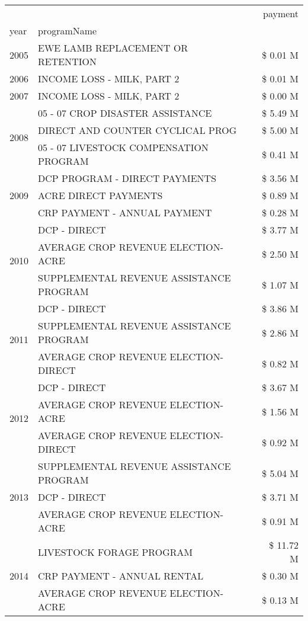 \begin{tabular}{llr}
\toprule
 &  & payment \\
year & programName &  \\
\midrule
2005 & EWE LAMB REPLACEMENT OR RETENTION & \$ 0.01 M \\
\cline{1-3}
2006 & INCOME LOSS - MILK, PART 2 & \$ 0.01 M \\
\cline{1-3}
2007 & INCOME LOSS - MILK, PART 2 & \$ 0.00 M \\
\cline{1-3}
\multirow[t]{3}{*}{2008} & 05 - 07 CROP DISASTER ASSISTANCE & \$ 5.49 M \\
 & DIRECT AND COUNTER CYCLICAL PROG & \$ 5.00 M \\
 & 05 - 07 LIVESTOCK COMPENSATION PROGRAM & \$ 0.41 M \\
\cline{1-3}
\multirow[t]{3}{*}{2009} & DCP PROGRAM - DIRECT PAYMENTS & \$ 3.56 M \\
 & ACRE DIRECT PAYMENTS & \$ 0.89 M \\
 & CRP PAYMENT - ANNUAL PAYMENT & \$ 0.28 M \\
\cline{1-3}
\multirow[t]{3}{*}{2010} & DCP - DIRECT & \$ 3.77 M \\
 & AVERAGE CROP REVENUE ELECTION-ACRE & \$ 2.50 M \\
 & SUPPLEMENTAL REVENUE ASSISTANCE PROGRAM & \$ 1.07 M \\
\cline{1-3}
\multirow[t]{3}{*}{2011} & DCP - DIRECT & \$ 3.86 M \\
 & SUPPLEMENTAL REVENUE ASSISTANCE PROGRAM & \$ 2.86 M \\
 & AVERAGE CROP REVENUE ELECTION-DIRECT & \$ 0.82 M \\
\cline{1-3}
\multirow[t]{3}{*}{2012} & DCP - DIRECT & \$ 3.67 M \\
 & AVERAGE CROP REVENUE ELECTION-ACRE & \$ 1.56 M \\
 & AVERAGE CROP REVENUE ELECTION-DIRECT & \$ 0.92 M \\
\cline{1-3}
\multirow[t]{3}{*}{2013} & SUPPLEMENTAL REVENUE ASSISTANCE PROGRAM & \$ 5.04 M \\
 & DCP - DIRECT & \$ 3.71 M \\
 & AVERAGE CROP REVENUE ELECTION-ACRE & \$ 0.91 M \\
\cline{1-3}
\multirow[t]{3}{*}{2014} & LIVESTOCK FORAGE PROGRAM & \$ 11.72 M \\
 & CRP PAYMENT - ANNUAL RENTAL & \$ 0.30 M \\
 & AVERAGE CROP REVENUE ELECTION-ACRE & \$ 0.13 M \\
\cline{1-3}

\end{tabular}
